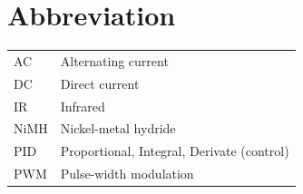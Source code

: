 \documentclass[11pt,a4paper,oneside,article]{memoir}
\begin{document}


\pagestyle{empty} %
\tableofcontents*
\pagestyle{empty} %
\clearpage
\pagestyle{plain}




\pagestyle{empty}
\setlength{\parskip}{1cm}
\chapter*{Abbreviation}
\begin{table}[h]
\setlength{\tabcolsep}{8pt}
\renewcommand{\arraystretch}{2}
\begin{tabular}{l p{12cm}}
AC	& Alternating current\\
DC	& Direct current\\
IR	& Infrared\\
NiMH	& Nickel-metal hydride\\
PID & Proportional, Integral, Derivate (control)\\
PWM & Pulse-width modulation\\

\end{tabular}
\end{table}

\newpage
\end{document}
